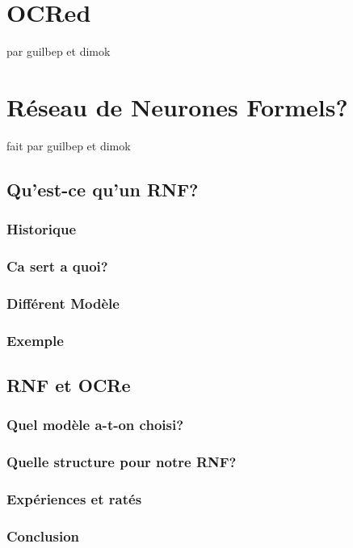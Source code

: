 \chapter{ OCRed }
par guilbep et dimok


\chapter{ R\'eseau de Neurones Formels?}
fait par guilbep et dimok

\section{ Qu'est-ce qu'un RNF?}
\subsection{Historique}
\subsection{Ca sert a quoi?}
\subsection{Diff\'erent Mod\`ele}
\subsection{Exemple}

\section{RNF et OCRe}
\subsection{Quel mod\`ele a-t-on choisi?}
\subsection{Quelle structure pour notre RNF?}
\subsection{Exp\'eriences et rat\'es}
\subsection{Conclusion}

